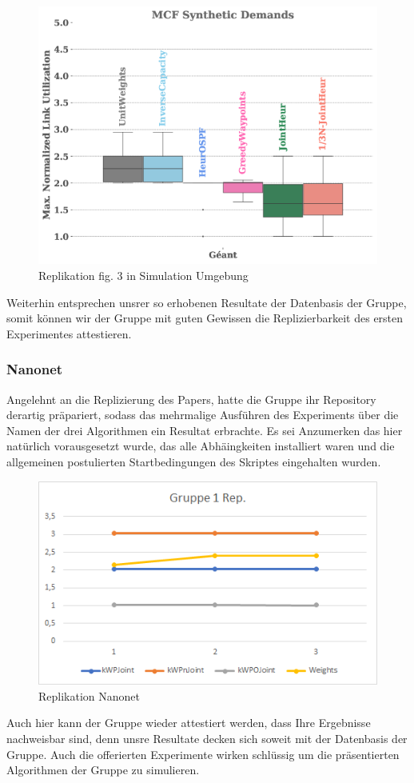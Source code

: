 \documentclass[sigconf,noacm,review]{acmart}
\begin{document}
\begin{figure}
  \centering
  \caption {Replikation fig. 3 in Simulation Umgebung}
  \label{fig:g02r}
  \includegraphics[width=\linewidth]{assets/g1rep2.png}
\end{figure}
Weiterhin entsprechen unsrer so erhobenen Resultate der Datenbasis der Gruppe, somit können wir der Gruppe mit guten Gewissen die Replizierbarkeit des ersten Experimentes attestieren.
\subsubsection{Nanonet}
Angelehnt an die Replizierung des Papers, hatte die Gruppe ihr Repository derartig präpariert, sodass das mehrmalige Ausführen des Experiments über die Namen der drei Algorithmen ein Resultat erbrachte. Es sei Anzumerken das hier natürlich vorausgesetzt wurde, das alle Abhäingkeiten installiert waren und die allgemeinen postulierten Startbedingungen des Skriptes eingehalten wurden.
\begin{figure}
  \centering
  \caption{Replikation Nanonet}
  \label{fig:g02r}
  \includegraphics[width=\linewidth]{assets/g01r.png}
\end{figure}
Auch hier kann der Gruppe wieder attestiert werden, dass Ihre Ergebnisse nachweisbar sind, denn unsre Resultate decken sich soweit mit der Datenbasis der Gruppe. Auch die offerierten Experimente wirken schlüssig um die präsentierten Algorithmen der Gruppe zu simulieren. 
\end{document}
